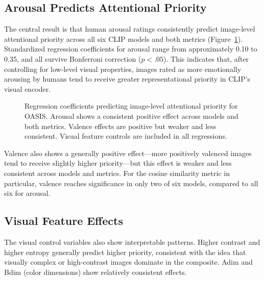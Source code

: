 \documentclass[12pt]{article}
\begin{document}
\subsection{Arousal Predicts Attentional Priority}

The central result is that human arousal ratings consistently predict image-level attentional priority across all six CLIP models and both metrics (Figure~\ref{fig:oasis_coefs}). Standardized regression coefficients for arousal range from approximately 0.10 to 0.35, and all survive Bonferroni correction ($p < .05$). This indicates that, after controlling for low-level visual properties, images rated as more emotionally arousing by humans tend to receive greater representational priority in CLIP's visual encoder.

\begin{figure}[h]
\centering
\caption{Regression coefficients predicting image-level attentional priority for OASIS. Arousal shows a consistent positive effect across models and both metrics. Valence effects are positive but weaker and less consistent. Visual feature controls are included in all regressions.}
\label{fig:oasis_coefs}
\end{figure}

Valence also shows a generally positive effect---more positively valenced images tend to receive slightly higher priority---but this effect is weaker and less consistent across models and metrics. For the cosine similarity metric in particular, valence reaches significance in only two of six models, compared to all six for arousal.

\subsection{Visual Feature Effects}

The visual control variables also show interpretable patterns. Higher contrast and higher entropy generally predict higher priority, consistent with the idea that visually complex or high-contrast images dominate in the composite. Adim and Bdim (color dimensions) show relatively consistent effects.
\end{document}
